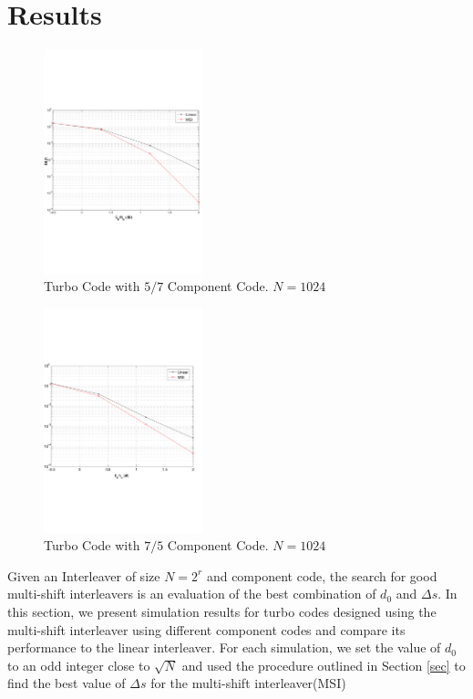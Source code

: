 \documentclass[technicalreport]{ieicej}
\begin{document}
\section{Results}
\begin{figure}[h!]
\centering
		\includegraphics[height = 6.5cm,trim={0 7.2cm 0 6cm},clip]{msi_linear_256_1000Frames_2.pdf}
		\caption{Turbo Code with $5/7$ Component Code. $N=1024$}
		\label{res1}
		\end{figure}
		
		\begin{figure}[h!]
\centering
		\includegraphics[height = 6.5cm,trim={0 7.2cm 0 6cm},clip]{msi_linear_1024_1000_7_5Frames.pdf}
		\caption{Turbo Code with $7/5$ Component Code. $N=1024$}
		\label{res2}
		\end{figure}
Given an Interleaver of size $N=2^r$ and component code, the search for good
multi-shift interleavers is an evaluation of the best combination of $d_0$ and $\Delta s$.
 In this section, we present simulation 
results
for turbo codes designed using the multi-shift interleaver using different component
codes and compare its performance to the linear interleaver. For each simulation, 
we set the value of $d_0$ to an odd integer close to $\sqrt{N}$
and used the procedure outlined in Section \ref{sec} to find the best value
of $\Delta s$ for the multi-shift interleaver(MSI)
\end{document}
